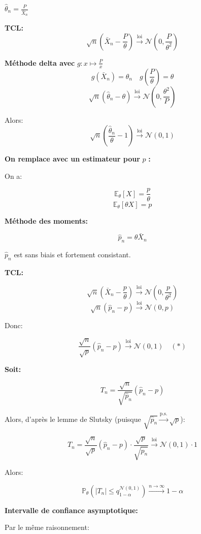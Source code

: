 \begin{correction}
\ques

$\hat{\theta}_n = \frac{P}{\bar{X}_n}$

\textbf{TCL:}
\[
\sqrt{n}\left(\bar{X}_n - \frac{P}{\theta}\right) \xrightarrow{\text{loi}} \mathcal{N}\left(0, \frac{P}{\theta^2}\right)
\]

\textbf{Méthode delta avec } $g : x \mapsto \frac{P}{x}$
\[
g(\bar{X}_n) = \hat{\theta}_n \quad g\left(\frac{P}{\theta}\right) = \theta
\]
\[
\sqrt{n}\left(\hat{\theta}_n - \theta\right) \xrightarrow{\text{loi}} \mathcal{N}\left(0, \frac{\theta^2}{P}\right)
\]

Alors:
\[
\sqrt{n}\left(\frac{\hat{\theta}_n}{\theta} - 1\right) \xrightarrow{\text{loi}} \mathcal{N}(0, 1)
\]

\textbf{On remplace avec un estimateur pour } $p$ \textbf{:}

On a: 

\[
\mathbb{E}_\theta [X] = \frac{p}{\theta}
\]
\[
\mathbb{E}_\theta [\theta X] = p
\]

\textbf{Méthode des moments:}

\[
\hat{p}_n = \theta \bar{X}_n
\]

$\hat{p}_n$ est sans biais et fortement consistant.

\textbf{TCL:}

\[
\sqrt{n}\left(\bar{X}_n - \frac{p}{\theta}\right) \xrightarrow{\text{loi}} \mathcal{N}\left(0, \frac{p}{\theta^2}\right)
\]
\[
\sqrt{n}(\hat{p}_n - p) \xrightarrow{\text{loi}} \mathcal{N}(0, p)
\]

Donc:

\[
\frac{\sqrt{n}}{\sqrt{p}}(\hat{p}_n - p) \xrightarrow{\text{loi}} \mathcal{N}(0, 1) \quad (*)
\]

\textbf{Soit:}

\[
T_n = \frac{\sqrt{n}}{\sqrt{\hat{p}_n}}(\hat{p}_n - p)
\]

Alors, d'après le lemme de Slutsky (puisque $\sqrt{\hat{p}_n} \xrightarrow{\text{p.s.}} \sqrt{p}$):

\[
T_n = \frac{\sqrt{n}}{\sqrt{p}}(\hat{p}_n - p) \cdot \frac{\sqrt{p}}{\sqrt{\hat{p}_n}} \xrightarrow{\text{loi}} \mathcal{N}(0, 1) \cdot 1
\]

Alors:

\[
\mathbb{P}_\theta\left(|T_n| \leq q^{\mathcal{N}(0,1)}_{1-\alpha}\right) \xrightarrow{n \to \infty} 1 - \alpha
\]

\textbf{Intervalle de confiance asymptotique:}

Par le même raisonnement:


\end{correction}
